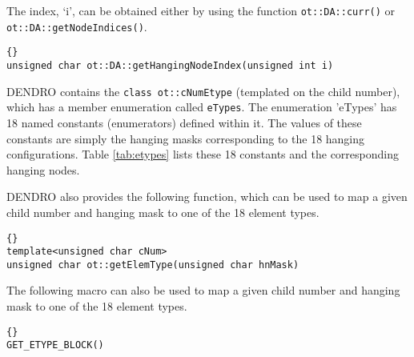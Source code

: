 \documentclass[12pt,reqno,a4paper]{report}
\numberwithin{equation}{section}
\begin{document}
The index, `i', can be obtained either by using the function \lstinline[basicstyle=\bfseries]!ot::DA::curr()! or \lstinline[basicstyle=\bfseries]!ot::DA::getNodeIndices()!.

\begin{lstlisting}[frame=trbl, fontadjust]{}
unsigned char ot::DA::getHangingNodeIndex(unsigned int i)
\end{lstlisting}

DENDRO contains the \lstinline[basicstyle=\bfseries]!class ot::cNumEtype! (templated on the child number), which has a member enumeration called \lstinline[basicstyle=\bfseries]!eTypes!. The enumeration 'eTypes' has 18 named constants (enumerators) defined within it. The values of these constants are simply the hanging masks corresponding to the 18 hanging configurations. Table \ref{tab:etypes} lists these 18 constants and the corresponding hanging nodes. 

DENDRO also provides the following function, which can be used to map a given child number and hanging mask to one of the 18 element types.

\begin{lstlisting}[frame=trbl, fontadjust]{}
template<unsigned char cNum>
unsigned char ot::getElemType(unsigned char hnMask)
\end{lstlisting}

The following macro can also be used to map a given child number and hanging mask to one of the 18 element types.

\begin{lstlisting}[frame=trbl, fontadjust]{}
GET_ETYPE_BLOCK()
\end{lstlisting}
   
\end{document}
